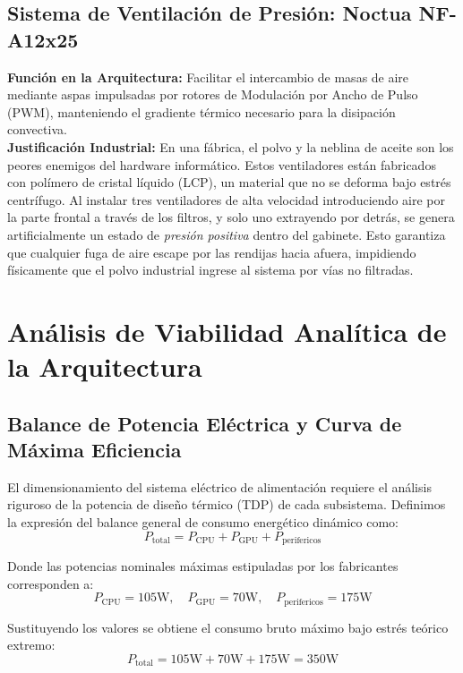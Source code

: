 \documentclass[12pt,letterpaper]{article}
\begin{document}
\subsection{Sistema de Ventilación de Presión: Noctua NF-A12x25}
\textbf{Función en la Arquitectura:} Facilitar el intercambio de masas de aire mediante aspas impulsadas por rotores de Modulación por Ancho de Pulso (PWM), manteniendo el gradiente térmico necesario para la disipación convectiva.
\\
\textbf{Justificación Industrial:} En una fábrica, el polvo y la neblina de aceite son los peores enemigos del hardware informático. Estos ventiladores están fabricados con polímero de cristal líquido (LCP), un material que no se deforma bajo estrés centrífugo. Al instalar tres ventiladores de alta velocidad introduciendo aire por la parte frontal a través de los filtros, y solo uno extrayendo por detrás, se genera artificialmente un estado de \textit{presión positiva} dentro del gabinete. Esto garantiza que cualquier fuga de aire escape por las rendijas hacia afuera, impidiendo físicamente que el polvo industrial ingrese al sistema por vías no filtradas.

\section{Análisis de Viabilidad Analítica de la Arquitectura}

\subsection{Balance de Potencia Eléctrica y Curva de Máxima Eficiencia}
El dimensionamiento del sistema eléctrico de alimentación requiere el análisis riguroso de la potencia de diseño térmico (TDP) de cada subsistema. Definimos la expresión del balance general de consumo energético dinámico como:
\begin{equation}
P_{\text{total}} = P_{\text{CPU}} + P_{\text{GPU}} + P_{\text{perifericos}}
\end{equation}

Donde las potencias nominales máximas estipuladas por los fabricantes corresponden a:
\begin{equation}
P_{\text{CPU}} = 105\text{W}, \quad P_{\text{GPU}} = 70\text{W}, \quad P_{\text{perifericos}} = 175\text{W}
\end{equation}

Sustituyendo los valores se obtiene el consumo bruto máximo bajo estrés teórico extremo:
\begin{equation}
P_{\text{total}} = 105\text{W} + 70\text{W} + 175\text{W} = 350\text{W}
\end{equation}
\end{document}
